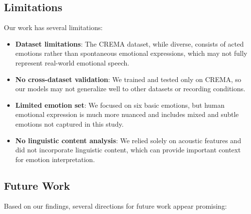 \subsection{Limitations}

Our work has several limitations:

\begin{itemize}
    \item \textbf{Dataset limitations}: The CREMA dataset, while diverse, consists of acted emotions rather than spontaneous emotional expressions, which may not fully represent real-world emotional speech.
    
    \item \textbf{No cross-dataset validation}: We trained and tested only on CREMA, so our models may not generalize well to other datasets or recording conditions.
    
    \item \textbf{Limited emotion set}: We focused on six basic emotions, but human emotional expression is much more nuanced and includes mixed and subtle emotions not captured in this study.
    
    \item \textbf{No linguistic content analysis}: We relied solely on acoustic features and did not incorporate linguistic content, which can provide important context for emotion interpretation.
\end{itemize}

\subsection{Future Work}

Based on our findings, several directions for future work appear promising:

